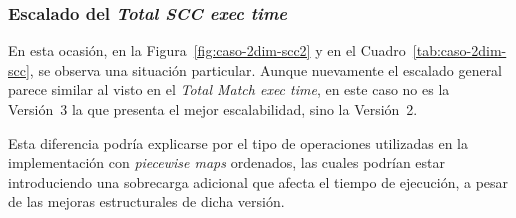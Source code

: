 \subsubsection{Escalado del \textit{Total SCC exec time}}

En esta ocasión, en la Figura~\ref{fig:caso-2dim-scc2} y en el Cuadro~\ref{tab:caso-2dim-scc}, se observa una situación particular. Aunque nuevamente el escalado general parece similar al visto en el \textit{Total Match exec time}, en este caso no es la Versión~3 la que presenta el mejor escalabilidad, sino la Versión~2.

Esta diferencia podría explicarse por el tipo de operaciones utilizadas en la implementación con \textit{piecewise maps} ordenados, las cuales podrían estar introduciendo una sobrecarga adicional que afecta el tiempo de ejecución, a pesar de las mejoras estructurales de dicha versión.

\begin{table}[ht]
\centering
{}
\caption{Cuadro comparativo del \textit{Total SCC exec time} de las diferentes versiones planteadas bajo un caso de prueba en dos dimensiones, variando el tamaño del caso de prueba}
\label{tab:caso-2dim-scc}
\end{table}


